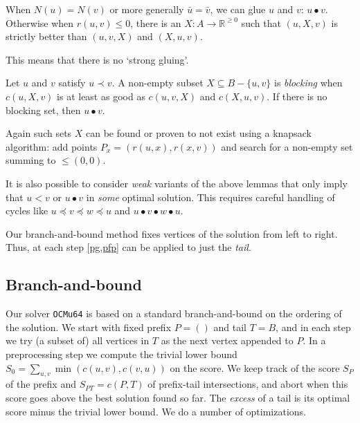 \documentclass[a4paper,UKenglish,cleveref, autoref, thm-restate]{lipics-v2021}
\renewcommand{\b}{\prec}
\newcommand{\be}{\preceq}
\newcommand{\g}{\bullet}
\begin{document}
\begin{remark}
  When $N(u)=N(v)$ or more generally $\bar u=\bar v$, we can glue $u$ and $v$: $u\g v$.
  Otherwise when $r(u,v)\leq 0$, there is an $X : A\to \mathbb R^{\geq 0}$ such that $(u, X, v)$ is
  strictly better than $(u,v,X)$ and $(X,u,v)$.
\end{remark}
This means that there is no `strong gluing'.
\begin{lemma}\label{pg}
  Let $u$ and $v$ satisfy $u\b v$.
  A non-empty subset $X\subseteq B-\{u,v\}$ is \emph{blocking} when $c(u, X, v)$ is at
  least as good as $c(u,v,X)$ and $c(X,u,v)$.
  If there is no blocking set, then $u \g v$.
\end{lemma}
Again such sets $X$ can be found or proven to not exist using a knapsack
algorithm: add points $P_x = (r(u, x), r(x, v))$ and search for a non-empty
set summing to $\leq{}(0,0)$.

\begin{remark}
  It is also possible to consider \emph{weak} variants of the above lemmas that
  only imply that $u<v$ or $u\g v$ in \emph{some} optimal solution. This requires careful
  handling of cycles like $u\be v\be w\be u$ and $u\g v\g w\g u$.
\end{remark}

\begin{remark}
  Our branch-and-bound method fixes vertices of the
solution from left to right. Thus, at each step \cref{pg,pfp} can be applied to
just the \emph{tail}.
\end{remark}


\subsection{Branch-and-bound}
Our solver \texttt{OCMu64} is based on a standard branch-and-bound on the ordering of the
solution.  We start with fixed prefix $P=()$ and tail $T=B$, and in each step we try (a
subset of) all vertices in $T$ as the next vertex appended to $P$.
In a preprocessing step we compute the trivial lower bound $S_0 =
\sum_{u,v}\min(c(u,v),c(v,u))$ on the score.
We keep track of the score $S_P$ of the prefix and $S_{PT}=c(P, T)$ of
prefix-tail intersections, and abort when this score goes above the best
solution found so far. The \emph{excess} of a tail is its optimal score minus
the trivial lower bound. We do a number of optimizations.
\end{document}
